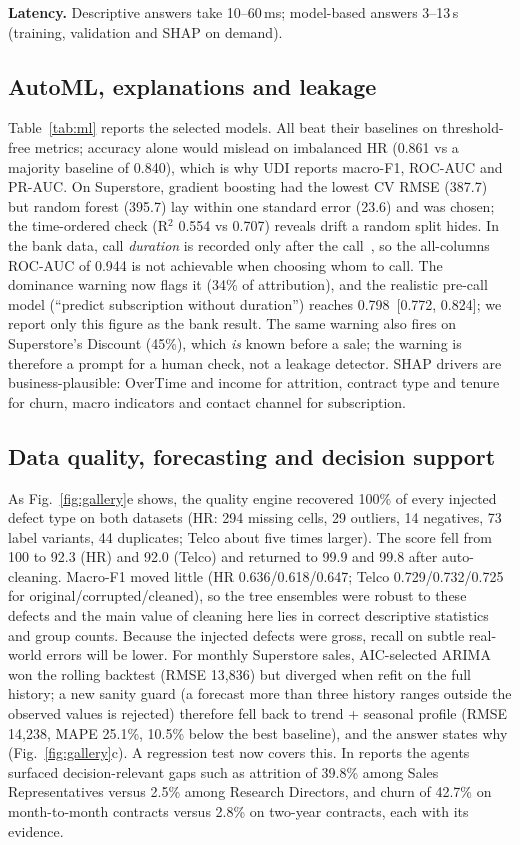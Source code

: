 \documentclass[conference]{IEEEtran}
\newcommand{\ci}[2]{\,{\scriptsize[#1, #2]}}
\begin{document}
\textbf{Latency.} Descriptive answers take 10--60\,ms; model-based answers 3--13\,s (training, validation and SHAP on demand).

\subsection{AutoML, explanations and leakage}
Table~\ref{tab:ml} reports the selected models. All beat their baselines on threshold-free metrics; accuracy alone would mislead on imbalanced HR (0.861 vs a majority baseline of 0.840), which is why UDI reports macro-F1, ROC-AUC and PR-AUC. On Superstore, gradient boosting had the lowest CV RMSE (387.7) but random forest (395.7) lay within one standard error (23.6) and was chosen; the time-ordered check (R$^2$ 0.554 vs 0.707) reveals drift a random split hides. In the bank data, call \emph{duration} is recorded only after the call~\cite{moro2014}, so the all-columns ROC-AUC of 0.944 is not achievable when choosing whom to call. The dominance warning now flags it (34\% of attribution), and the realistic pre-call model (``predict subscription without duration'') reaches 0.798 \ci{0.772}{0.824}; we report only this figure as the bank result. The same warning also fires on Superstore's Discount (45\%), which \emph{is} known before a sale; the warning is therefore a prompt for a human check, not a leakage detector. SHAP drivers are business-plausible: OverTime and income for attrition, contract type and tenure for churn, macro indicators and contact channel for subscription.

\subsection{Data quality, forecasting and decision support}
As Fig.~\ref{fig:gallery}e shows, the quality engine recovered 100\% of every injected defect type on both datasets (HR: 294 missing cells, 29 outliers, 14 negatives, 73 label variants, 44 duplicates; Telco about five times larger). The score fell from 100 to 92.3 (HR) and 92.0 (Telco) and returned to 99.9 and 99.8 after auto-cleaning. Macro-F1 moved little (HR 0.636/0.618/0.647; Telco 0.729/0.732/0.725 for original/corrupted/cleaned), so the tree ensembles were robust to these defects and the main value of cleaning here lies in correct descriptive statistics and group counts. Because the injected defects were gross, recall on subtle real-world errors will be lower. For monthly Superstore sales, AIC-selected ARIMA won the rolling backtest (RMSE 13,836) but diverged when refit on the full history; a new sanity guard (a forecast more than three history ranges outside the observed values is rejected) therefore fell back to trend + seasonal profile (RMSE 14,238, MAPE 25.1\%, 10.5\% below the best baseline), and the answer states why (Fig.~\ref{fig:gallery}c). A regression test now covers this. In reports the agents surfaced decision-relevant gaps such as attrition of 39.8\% among Sales Representatives versus 2.5\% among Research Directors, and churn of 42.7\% on month-to-month contracts versus 2.8\% on two-year contracts, each with its evidence.
\end{document}
